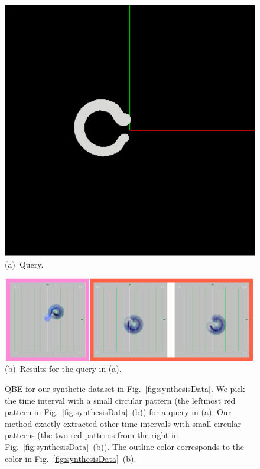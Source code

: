 \begin{figure}[tb]
    \centering
    \begin{minipage}{0.24\linewidth}
        \centering
        \includegraphics[width=.99\linewidth]{vgtc_journal_latex/figures/QBE.png}
        \footnotesize{\sf (a)~Query.}
    \end{minipage}
    \begin{minipage}{0.75\linewidth}
        \centering
        \includegraphics[width=.99\linewidth]{vgtc_journal_latex/figures/QBEdemodataResults.png}
        \footnotesize{\sf(b)~Results for the query in (a).}
    \end{minipage}
    \caption{QBE for our synthetic dataset in Fig.~\ref{fig:synthesisData}. 
        We pick the time interval with a small circular pattern (the leftmost red pattern in Fig.~\ref{fig:synthesisData}~(b)) for a query in (a). 
        Our method exactly extracted other time intervals with small circular patterns (the two red patterns from the right in Fig.~\ref{fig:synthesisData}~(b)).
        The outline color corresponds to the color in Fig.~\ref{fig:synthesisData}~(b).}
    \label{fig:QBEDemodata}
\end{figure}
